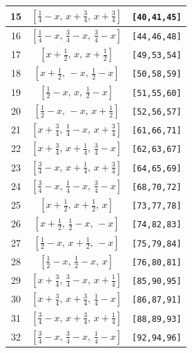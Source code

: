 \documentclass[fleqn,8pt]{jsarticle}
\begin{document}
\begin{longtable}{ccc}
15 & $\left[ \frac{1}{4} - x,\, x + \frac{3}{4},\, x + \frac{3}{4} \right]$ & {\tt [40,41,45]} \\ \hline
16 & $\left[ \frac{1}{4} - x,\, \frac{3}{4} - x,\, \frac{3}{4} - x \right]$ & {\tt [44,46,48]} \\ \hline
17 & $\left[ x + \frac{1}{2},\, x,\, x + \frac{1}{2} \right]$ & {\tt [49,53,54]} \\ \hline
18 & $\left[ x + \frac{1}{2},\, - x,\, \frac{1}{2} - x \right]$ & {\tt [50,58,59]} \\ \hline
19 & $\left[ \frac{1}{2} - x,\, x,\, \frac{1}{2} - x \right]$ & {\tt [51,55,60]} \\ \hline
20 & $\left[ \frac{1}{2} - x,\, - x,\, x + \frac{1}{2} \right]$ & {\tt [52,56,57]} \\ \hline
21 & $\left[ x + \frac{3}{4},\, \frac{1}{4} - x,\, x + \frac{3}{4} \right]$ & {\tt [61,66,71]} \\ \hline
22 & $\left[ x + \frac{3}{4},\, x + \frac{1}{4},\, \frac{3}{4} - x \right]$ & {\tt [62,63,67]} \\ \hline
23 & $\left[ \frac{3}{4} - x,\, x + \frac{1}{4},\, x + \frac{3}{4} \right]$ & {\tt [64,65,69]} \\ \hline
24 & $\left[ \frac{3}{4} - x,\, \frac{1}{4} - x,\, \frac{3}{4} - x \right]$ & {\tt [68,70,72]} \\ \hline
25 & $\left[ x + \frac{1}{2},\, x + \frac{1}{2},\, x \right]$ & {\tt [73,77,78]} \\ \hline
26 & $\left[ x + \frac{1}{2},\, \frac{1}{2} - x,\, - x \right]$ & {\tt [74,82,83]} \\ \hline
27 & $\left[ \frac{1}{2} - x,\, x + \frac{1}{2},\, - x \right]$ & {\tt [75,79,84]} \\ \hline
28 & $\left[ \frac{1}{2} - x,\, \frac{1}{2} - x,\, x \right]$ & {\tt [76,80,81]} \\ \hline
29 & $\left[ x + \frac{3}{4},\, \frac{3}{4} - x,\, x + \frac{1}{4} \right]$ & {\tt [85,90,95]} \\ \hline
30 & $\left[ x + \frac{3}{4},\, x + \frac{3}{4},\, \frac{1}{4} - x \right]$ & {\tt [86,87,91]} \\ \hline
31 & $\left[ \frac{3}{4} - x,\, x + \frac{3}{4},\, x + \frac{1}{4} \right]$ & {\tt [88,89,93]} \\ \hline
32 & $\left[ \frac{3}{4} - x,\, \frac{3}{4} - x,\, \frac{1}{4} - x \right]$ & {\tt [92,94,96]} \\
\end{longtable}
\renewcommand{\arraystretch}{1.2}
\end{document}
